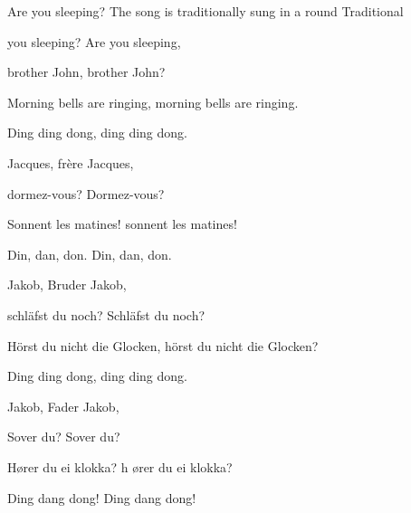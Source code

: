 \begin{SBSong}{Are you sleeping?}
  {The song is traditionally sung in a round}
  {Traditional}
  \begin{SBVerse}
     you sleeping? Are you sleeping, 

    brother John, brother John?

    Morning bells are ringing, morning bells are ringing.

    Ding ding dong, ding ding dong.
  \end{SBVerse}
  \begin{SBVerse}
     Jacques, fr\`{e}re Jacques, 

    dormez-vous? Dormez-vous?

    Sonnent les matines! sonnent les matines!

    Din, dan, don. Din, dan, don.
  \end{SBVerse}
  \begin{SBVerse}
     Jakob, Bruder Jakob, 

    schl\"{a}fst du noch? Schl\"{a}fst du noch?

    H\"{o}rst du nicht die Glocken, h\"{o}rst du nicht die Glocken?

    Ding ding dong, ding ding dong.
  \end{SBVerse}
  \begin{SBVerse}
     Jakob, Fader Jakob, 

    Sover du? Sover du?

    H\o rer du ei klokka? h \o rer du ei klokka?

    Ding dang dong! Ding dang dong!
  \end{SBVerse}
\end{SBSong}
